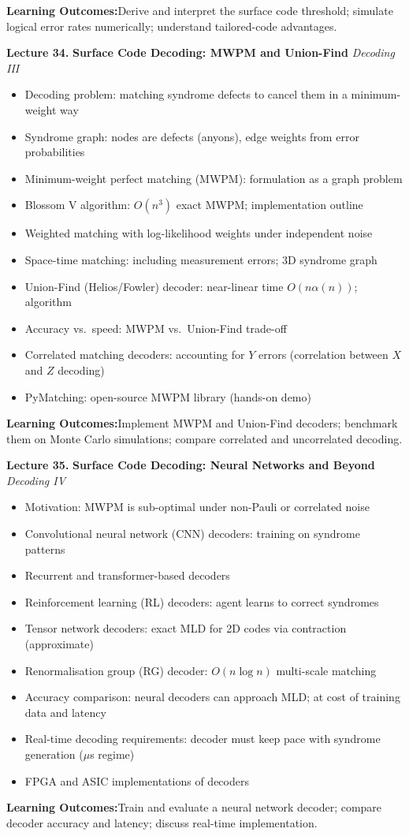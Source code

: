 \documentclass[12pt,oneside]{article}
\newcommand{\lecturetitle}[3]{%
  \vspace{10pt}
  \begin{tcolorbox}[
    enhanced,breakable,
    colback=highlight,colframe=accent,
    arc=2pt,left=10pt,right=8pt,top=7pt,bottom=7pt,boxrule=0.7pt
  ]
    \textbf{\color{accent}Lecture #1.\enspace}%
    {\color{primary}\bfseries #2}%
    \hfill{\small\color{warmgold}\textit{#3}}
  \end{tcolorbox}
  \vspace{-2pt}
}
\newcommand{\topics}[1]{%
  \begin{itemize}[leftmargin=1.5em,itemsep=1.5pt,topsep=3pt,parsep=0pt]
    #1
  \end{itemize}\vspace{2pt}
}
\newcommand{\T}[1]{\item #1}
\newcommand{\keybox}[1]{%
  \begin{tcolorbox}[
    enhanced,colback=lightgray,colframe=rulegray,
    arc=2pt,left=8pt,right=8pt,top=5pt,bottom=5pt,boxrule=0.4pt,
    fontupper=\small
  ]
    \textbf{\color{primary}Learning Outcomes:\enspace}#1
  \end{tcolorbox}\vspace{4pt}
}
\begin{document}
\keybox{Derive and interpret the surface code threshold; simulate logical error rates numerically; understand tailored-code advantages.}

\lecturetitle{34}{Surface Code Decoding: MWPM and Union-Find}{Decoding III}

\topics{
  \T{Decoding problem: matching syndrome defects to cancel them in a minimum-weight way}
  \T{Syndrome graph: nodes are defects (anyons), edge weights from error probabilities}
  \T{Minimum-weight perfect matching (MWPM): formulation as a graph problem}
  \T{Blossom V algorithm: $O(n^3)$ exact MWPM; implementation outline}
  \T{Weighted matching with log-likelihood weights under independent noise}
  \T{Space-time matching: including measurement errors; 3D syndrome graph}
  \T{Union-Find (Helios/Fowler) decoder: near-linear time $O(n\alpha(n))$; algorithm}
  \T{Accuracy vs.\ speed: MWPM vs.\ Union-Find trade-off}
  \T{Correlated matching decoders: accounting for $Y$ errors (correlation between $X$ and $Z$ decoding)}
  \T{PyMatching: open-source MWPM library (hands-on demo)}
}

\keybox{Implement MWPM and Union-Find decoders; benchmark them on Monte Carlo simulations; compare correlated and uncorrelated decoding.}

\lecturetitle{35}{Surface Code Decoding: Neural Networks and Beyond}{Decoding IV}

\topics{
  \T{Motivation: MWPM is sub-optimal under non-Pauli or correlated noise}
  \T{Convolutional neural network (CNN) decoders: training on syndrome patterns}
  \T{Recurrent and transformer-based decoders}
  \T{Reinforcement learning (RL) decoders: agent learns to correct syndromes}
  \T{Tensor network decoders: exact MLD for 2D codes via contraction (approximate)}
  \T{Renormalisation group (RG) decoder: $O(n\log n)$ multi-scale matching}
  \T{Accuracy comparison: neural decoders can approach MLD; at cost of training data and latency}
  \T{Real-time decoding requirements: decoder must keep pace with syndrome generation ($\mu$s regime)}
  \T{FPGA and ASIC implementations of decoders}
}

\keybox{Train and evaluate a neural network decoder; compare decoder accuracy and latency; discuss real-time implementation.}
\end{document}
